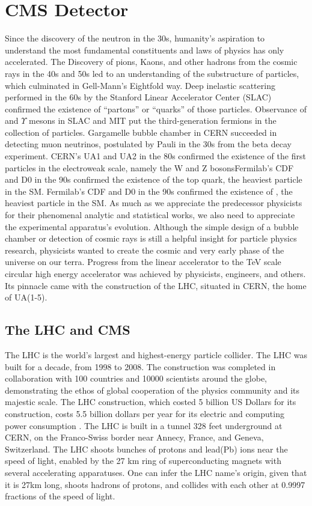 \chapter{CMS Detector}\label{sec:detectors}
Since the discovery of the neutron in the 30s, humanity's aspiration to understand the most fundamental constituents and laws of physics has only accelerated.
The Discovery of pions, Kaons, and other hadrons from the cosmic rays in the 40s and 50s led to an understanding of the substructure of particles, which culminated in Gell-Mann's Eightfold way.
Deep inelastic scattering performed in the 60s by the Stanford Linear Accelerator Center (SLAC) confirmed the existence of ``partons'' or ``quarks'' of those particles.
Observance of \PJGy and $\Upsilon$ mesons in SLAC and MIT put the third-generation fermions in the collection of particles.
Gargamelle bubble chamber in CERN succeeded in detecting muon neutrinos, postulated by Pauli in the 30s from the beta decay experiment.
CERN's UA1 and UA2 in the 80s confirmed the existence of the first particles in the electroweak scale, namely the W and Z bosonsFermilab's CDF and D0 in the 90s confirmed the existence of the top quark, the heaviest particle in the SM.
Fermilab's CDF and D0 in the 90s confirmed the existence of \PQt , the heaviest particle in the SM.
As much as we appreciate the predecessor physicists for their phenomenal analytic and statistical works, we also need to appreciate the experimental apparatus's evolution.
Although the simple design of a bubble chamber or detection of cosmic rays is still a helpful insight for particle physics research, physicists wanted to create the cosmic and very early phase of the universe on our terra.
Progress from the linear accelerator to the TeV scale circular high energy accelerator was achieved by physicists, engineers, and others.
Its pinnacle came with the construction of the LHC, situated in CERN, the home of UA(1-5).


\section{The LHC and CMS}
The LHC is the world's largest and highest-energy particle collider.
The LHC was built for a decade, from 1998 to 2008.
The construction was completed in collaboration with 100 countries and 10000 scientists around the globe, demonstrating the ethos of global cooperation of the physics community and its majestic scale.
The LHC construction, which costed 5 billion US Dollars for its construction, costs 5.5 billion dollars per year for its electric and computing power consumption \cite{LHCweb}.
The LHC is built in a tunnel 328 feet underground at CERN, on the Franco-Swiss border near Annecy, France, and  Geneva, Switzerland.
The LHC shoots bunches of protons and lead(Pb) ions near the speed of light, enabled by the 27 km ring of superconducting magnets with several accelerating apparatuses.
One can infer the LHC name's origin, given that it is 27km long, shoots hadrons of protons, and collides with each other at 0.9997 fractions of the speed of light.

